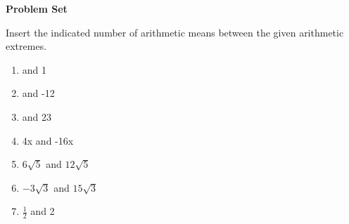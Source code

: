 \textbf{Problem Set}

Insert the indicated number of arithmetic means between the given arithmetic extremes.   
\begin{enumerate}
\item {} and  1 \hspce  [2]
\item {} and  -12 \hspce  [3]
\item {} and  23  \hspce [4]
\item \hspce 4x and  -16x  \hspce [4] 
\item \hspce $6\sqrt{5}$ and $12\sqrt{5}$ \hspce [1] 
\item \hspce $-3\sqrt{3}$ and $15\sqrt{3}$ \hspce [5] 
\item \hspce $\displaystyle \frac{1}{2}$ and 2 \hspce [2]
\end{enumerate}